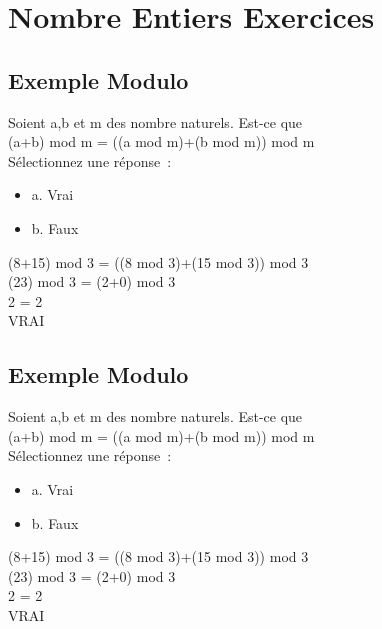 \newpage

\section{Nombre Entiers Exercices}
\vspace{5mm} %

\subsection{Exemple Modulo}
\vspace{3mm} %

Soient a,b et m des nombre naturels. Est-ce que\\
(a+b) mod m = ((a mod m)+(b mod m)) mod m \\

Sélectionnez une réponse : \\

\begin{itemize}[label=$\square$]
\item {a. Vrai}
\item {b. Faux}
\end{itemize}

(8+15) mod 3 = ((8 mod 3)+(15 mod 3)) mod 3 \\
(23) mod 3 = (2+0) mod 3 \\
2 = 2 \\
VRAI \\

\subsection{Exemple  Modulo}
\vspace{3mm} %

Soient a,b et m des nombre naturels. Est-ce que\\
(a+b) mod m = ((a mod m)+(b mod m)) mod m \\

Sélectionnez une réponse : \\

\begin{itemize}[label=$\square$]
\item {a. Vrai}
\item {b. Faux}
\end{itemize}

(8+15) mod 3 = ((8 mod 3)+(15 mod 3)) mod 3 \\
(23) mod 3 = (2+0) mod 3 \\
2 = 2 \\
VRAI \\

